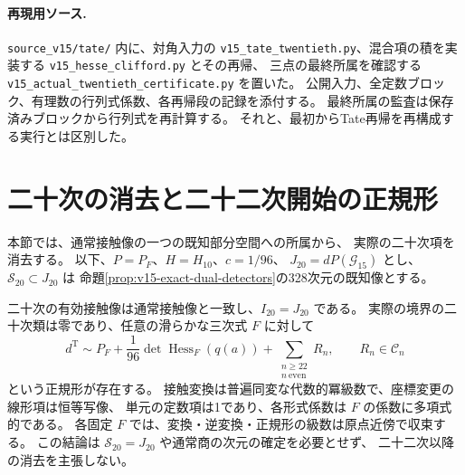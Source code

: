 \paragraph{再現用ソース.}
\texttt{source\_v15/tate/} 内に、対角入力の
\nolinkurl{v15_tate_twentieth.py}、混合項の積を実装する
\nolinkurl{v15_hesse_clifford.py} とその再帰、
三点の最終所属を確認する
\nolinkurl{v15_actual_twentieth_certificate.py} を置いた。
公開入力、全定数ブロック、有理数の行列式係数、各再帰段の記録を添付する。
最終所属の監査は保存済みブロックから行列式を再計算する。
それと、最初からTate再帰を再構成する実行とは区別した。




\section{二十次の消去と二十二次開始の正規形}
\label{sec:v15-twenty-second}

本節では、通常接触像の一つの既知部分空間への所属から、
実際の二十次項を消去する。
以下、$P=P_F$、$H=H_{10}$、$c=1/96$、
$J_{20}=dP(\mathcal G_{15})$ とし、
$\mathcal S_{20}\subset J_{20}$ は
命題\ref{prop:v15-exact-dual-detectors}の328次元の既知像とする。

\begin{theorem}[二十二次開始の普遍代数的収束偶正規形]
\label{thm:v15-twenty-second-normal-form}
二十次の有効接触像は通常接触像と一致し、$I_{20}=J_{20}$ である。
実際の境界の二十次類は零であり、任意の滑らかな三次式 $F$ に対して
\begin{equation}\label{eq:v15-twenty-second-normal-form}
 \boxed{\displaystyle
 d^{\mathrm T}\sim
 P_F+\frac1{96}\det\operatorname{Hess}_F(q(a))
       +\sum_{\substack{n\ge22\\ n\ \mathrm{even}}}R_n,
 \qquad R_n\in\mathcal C_n
 }
\end{equation}
という正規形が存在する。
接触変換は普遍同変な代数的冪級数で、座標変更の線形項は恒等写像、
単元の定数項は1であり、各形式係数は $F$ の係数に多項式的である。
各固定 $F$ では、変換・逆変換・正規形の級数は原点近傍で収束する。
この結論は $\mathcal S_{20}=J_{20}$ や通常商の次元の確定を必要とせず、
二十二次以降の消去を主張しない。
\end{theorem}

